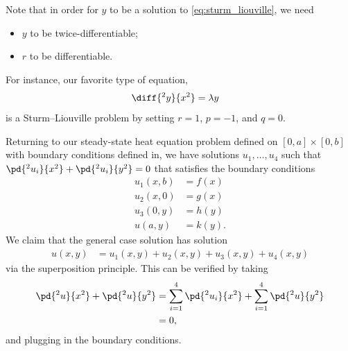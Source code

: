 \documentclass[10pt]{mypackage}
\begin{document}
Note that in order for $y$ to be a solution to \eqref{eq:sturm_liouville}, we need
\begin{itemize}
  \item $y$ to be twice-differentiable;
  \item $r$ to be differentiable.
\end{itemize}
For instance, our favorite type of equation,
\begin{align*}
  \diff{^2y}{x^2} &= \lambda y
\end{align*}
is a Sturm--Liouville problem by setting $r = 1$, $p = -1$, and $q = 0$.
\begin{example}
Returning to our steady-state heat equation problem defined on $[0,a]\times [0,b]$ with boundary conditions defined in, we have solutions $u_1,\dots,u_4$ such that $\pd{^2u_i}{x^2} + \pd{^2u_i}{y^2} = 0$ that satisfies the boundary conditions
\begin{align*}
  u_1\left( x,b \right) &= f(x)\\
  u_2\left( x,0 \right) &= g(x)\\
  u_3\left( 0,y \right) &= h(y)\\
  u\left( a,y \right) &= k(y).
\end{align*}
We claim that the general case solution has solution
\begin{align*}
  u\left( x,y \right) &= u_1\left( x,y \right) + u_2\left( x,y \right) + u_3\left( x,y \right) + u_4\left( x,y \right)
\end{align*}
via the superposition principle. This can be verified by taking
\begin{align*}
  \pd{^2u}{x^2} + \pd{^2u}{y^2} &= \sum_{i=1}^{4}\pd{^2u_i}{x^2} + \sum_{i=1}^{4}\pd{^2u}{y^2}\\
                                &= 0,
\end{align*}
and plugging in the boundary conditions.
\end{example}
\end{document}
